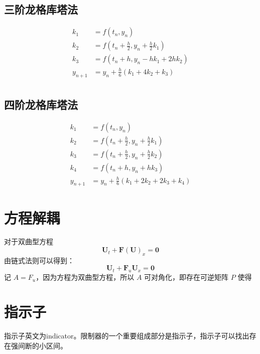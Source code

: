 \documentclass{article}
\numberwithin{equation}{subsection}    %
\begin{document}
\subsection{三阶龙格库塔法}
\begin{equation}
    \begin{aligned}
        k_1     & = f(t_n, y_n)                                \\
        k_2     & = f(t_n + \frac{h}{2}, y_n + \frac{h}{2}k_1) \\
        k_3     & = f(t_n + h, y_n - hk_1 + 2hk_2)             \\
        y_{n+1} & = y_n + \frac{h}{6}(k_1 + 4k_2 + k_3)        \\
    \end{aligned}
\end{equation}

\subsection{四阶龙格库塔法}
\begin{equation}
    \begin{aligned}
        k_{1}   & =f\left(t_{n}, y_{n}\right)                                \\
        k_{2}   & =f\left(t_{n}+\frac{h}{2}, y_{n}+\frac{h}{2} k_{1}\right)  \\
        k_{3}   & =f\left(t_{n}+\frac{h}{2}, y_{n}+\frac{h}{2} k_{2}\right)  \\
        k_{4}   & =f\left(t_{n}+h, y_{n}+h k_{3}\right)                      \\
        y_{n+1} & =y_{n}+\frac{h}{6}\left(k_{1}+2 k_{2}+2 k_{3}+k_{4}\right)
    \end{aligned}
\end{equation}
\section{方程解耦}
对于双曲型方程
\begin{equation}
    \mathbf{U}_{t}+\mathbf{F}(\mathbf{U})_{x}=\mathbf{0}
\end{equation}
由链式法则可以得到：
\begin{equation}
    \mathbf{U}_{t}+\mathbf{F}_u\mathbf{U}_{x}=\mathbf{0}
\end{equation}
记 $A=F_u$，因为方程为双曲型方程，所以 $A$ 可对角化，即存在可逆矩阵 $P$ 使得
\section{指示子}
指示子英文为indicator。限制器的一个重要组成部分是指示子，指示子可以找出存在强间断的小区间。
\end{document}
